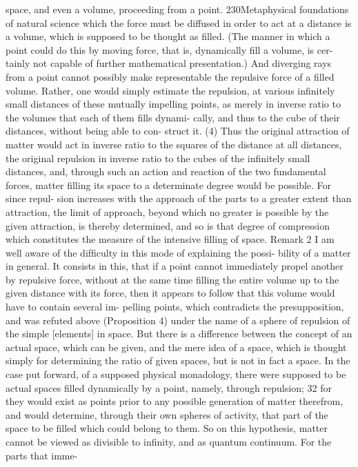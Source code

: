 space, and even a volume, proceeding from a point.
230Metaphysical foundations of natural science
which the force must be diffused in order to act at a distance is a volume,
which is supposed to be thought as ﬁlled. (The manner in which a point
could do this by moving force, that is, dynamically ﬁll a volume, is cer-
tainly not capable of further mathematical presentation.) And diverging
rays from a point cannot possibly make representable the repulsive force
of a ﬁlled volume. Rather, one would simply estimate the repulsion, at
various inﬁnitely small distances of these mutually impelling points, as
merely in inverse ratio to the volumes that each of them ﬁlls dynami-
cally, and thus to the cube of their distances, without being able to con-
struct it.
(4) Thus the original attraction of matter would act in inverse ratio
to the squares of the distance at all distances, the original repulsion in
inverse ratio to the cubes of the inﬁnitely small distances, and, through
such an action and reaction of the two fundamental forces, matter ﬁlling
its space to a determinate degree would be possible. For since repul-
sion increases with the approach of the parts to a greater extent than
attraction, the limit of approach, beyond which no greater is possible
by the given attraction, is thereby determined, and so is that degree of
compression which constitutes the measure of the intensive ﬁlling of
space.
Remark 2
I am well aware of the difﬁculty in this mode of explaining the possi-
bility of a matter in general. It consists in this, that if a point cannot
immediately propel another by repulsive force, without at the same time
ﬁlling the entire volume up to the given distance with its force, then
it appears to follow that this volume would have to contain several im-
pelling points, which contradicts the presupposition, and was refuted
above (Proposition 4) under the name of a sphere of repulsion of the
simple [elements] in space. But there is a difference between the concept
of an actual space, which can be given, and the mere idea of a space, which
is thought simply for determining the ratio of given spaces, but is not in
fact a space. In the case put forward, of a supposed physical monadology,
there were supposed to be actual spaces ﬁlled dynamically by a point,
namely, through repulsion; 32 for they would exist as points prior to any
possible generation of matter therefrom, and would determine, through
their own spheres of activity, that part of the space to be ﬁlled which
could belong to them. So on this hypothesis, matter cannot be viewed as
divisible to inﬁnity, and as quantum continuum. For the parts that imme-
